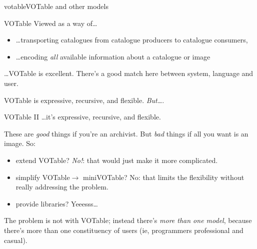 \documentclass[pdf,final,norman]{prosper}
\newenvironment{myslide}[1]{\begin{slide}{#1}\slidetoc{#1}}{\end{slide}}
\begin{document}
\begin{slidegroup}{votable}{VOTable and other models}

\begin{myslide}{VOTable}
Viewed as a way of\dots
\begin{itemize}
\item \dots transporting catalogues from catalogue producers to catalogue
consumers,
\item \dots encoding \emph{all} available information about a
catalogue or image
\end{itemize}
\dots VOTable is excellent.  There's a good match here between system,
language and user.

VOTable is expressive, recursive, and flexible.  \emph{But\dots}. 
\end{myslide}

\begin{myslide}{VOTable II}
\dots it's expressive, recursive, and flexible.

These are \emph{good} things if you're an archivist.  But \emph{bad}
things if all you want is an image.  So:
\begin{itemize}
\item extend VOTable?  \emph{No!}: that would just make it more complicated.
\item simplify VOTable$\to$ miniVOTable?  No: that limits the
flexibility without really addressing the problem.
\item provide libraries?  Yeeesss\dots
\end{itemize}
The problem is not with VOTable; instead there's \emph{more than one
model}, because there's more than one constituency of users (ie,
programmers professional and casual).
\end{myslide}


\end{slidegroup}
\end{document}
